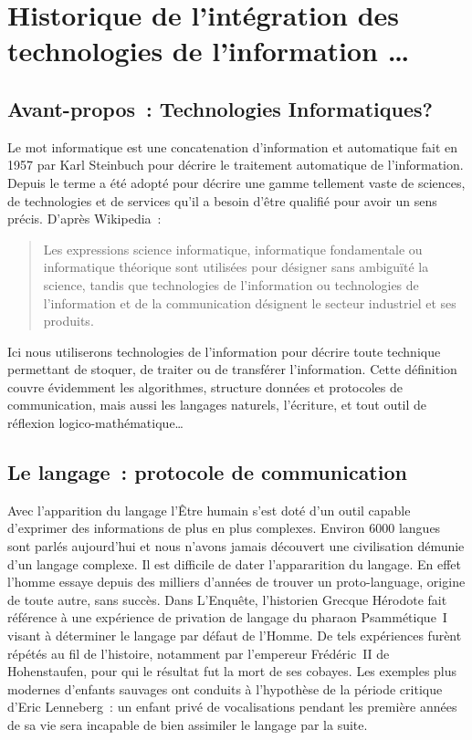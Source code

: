 
\chapter{Historique de l'intégration des technologies de l'information \ldots}\label{quoi}

\section*{Avant-propos~: Technologies \og{}Informatiques\fg{}?}
Le mot \og{}informatique\fg{} est une concatenation d'\og{}information\fg{} et \og{}automatique\fg{} fait en 1957 par Karl Steinbuch\cite{steinbuch-2005} pour décrire le traitement automatique de l'information. 
Depuis le terme a été adopté pour décrire une gamme tellement vaste de sciences, de technologies et de services qu'il a besoin d'être qualifié pour avoir un sens précis. D'après Wikipedia\cite{wiki-informatique}~:
\begin{quote}
Les expressions \og{}science informatique\fg{}, \og{}informatique fondamentale\fg{} ou \og{}informatique théorique\fg{} sont utilisées pour désigner sans ambiguïté la science, tandis que \og{}technologies de l'information\fg{} ou \og{}technologies de l'information et de la communication\fg{} désignent le secteur industriel et ses produits.
\end{quote}
Ici nous utiliserons \og{}technologies de l'information\fg{} pour décrire toute technique permettant de stoquer, de traiter ou de transférer l'information. Cette définition couvre évidemment les algorithmes, structure données et protocoles de communication, mais aussi les langages naturels, l'écriture, et tout outil de réflexion logico-mathématique\ldots

\section{Le langage~: protocole de communication}
Avec l'apparition du langage l'Être humain s'est doté d'un outil capable d'exprimer des informations de plus en plus complexes. Environ 6000 langues sont parlés aujourd'hui et nous n'avons jamais découvert une civilisation démunie d'un langage complexe\cite{linguistics-pinker}. Il est difficile de dater l'appararition du langage. En effet l'homme essaye depuis des milliers d'années de trouver un \og{}proto-language\fg{}, origine de toute autre, sans succès. Dans \og{}L'Enquête\fg{}, l'historien Grecque Hérodote fait référence à une expérience de \og{}privation de langage\fg{} du pharaon Psammétique~I visant à déterminer le langage \og{}par défaut\fg{} de l'Homme\cite{herodote-privation}. De tels expériences furènt répétés au fil de l'histoire, notamment par l'empereur Frédéric~II de Hohenstaufen, pour qui le résultat fut la mort de ses \og{}cobayes\fg{}\cite{ggcoulton-francis-to-dante}. Les exemples plus modernes d'enfants \og{}sauvages\fg{} ont conduits à l'hypothèse de la \og{}période critique\fg{} d'Eric Lenneberg\cite{lenneberg-crit-period}~: un enfant privé de vocalisations pendant les première années de sa vie sera incapable de bien assimiler le langage par la suite.


